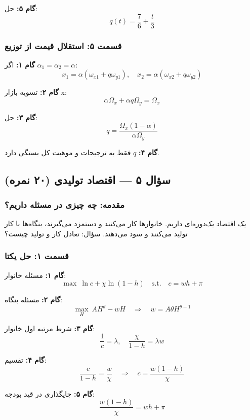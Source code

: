 \documentclass[12pt,a4paper]{article}
\begin{document}
\textbf{گام ۵:} حل:
\[
	\boxed{q(t) = \frac{7}{6} + \frac{t}{3}}
\]

\subsubsection{قسمت ۵: استقلال قیمت از توزیع}

\textbf{گام ۱:} اگر $\alpha_1 = \alpha_2 = \alpha$:
\[
	x_1 = \alpha(\omega_{x1} + q \omega_{y1}), \quad x_2 = \alpha(\omega_{x2} + q \omega_{y2})
\]

\textbf{گام ۲:} تسویه بازار x:
\[
	\alpha \Omega_x + \alpha q \Omega_y = \Omega_x
\]

\textbf{گام ۳:} حل:
\[
	\boxed{q = \frac{\Omega_x (1 - \alpha)}{\alpha \Omega_y}}
\]

\textbf{گام ۴:} $q$ فقط به ترجیحات و موهبت کل بستگی دارد.

\subsection{سؤال ۵ — اقتصاد تولیدی (۲۰ نمره)}

\subsubsection{مقدمه: چه چیزی در مسئله داریم؟}

یک اقتصاد یک‌دوره‌ای داریم. خانوارها کار می‌کنند و دستمزد می‌گیرند، بنگاه‌ها با کار تولید می‌کنند و سود می‌دهند. سؤال: تعادل کار و تولید چیست؟

\subsubsection{قسمت ۱: حل یکتا}

\textbf{گام ۱:} مسئله خانوار:
\[
	\max \ \ln c + \chi \ln(1-h) \quad \text{s.t.} \quad c = w h + \pi
\]

\textbf{گام ۲:} مسئله بنگاه:
\[
	\max_{H} \ A H^\theta - w H \quad \Rightarrow \quad w = A \theta H^{\theta - 1}
\]

\textbf{گام ۳:} شرط مرتبه اول خانوار:
\[
	\frac{1}{c} = \lambda, \quad \frac{\chi}{1 - h} = \lambda w
\]

\textbf{گام ۴:} تقسیم:
\[
	\frac{c}{1 - h} = \frac{w}{\chi} \quad \Rightarrow \quad c = \frac{w(1 - h)}{\chi}
\]

\textbf{گام ۵:} جایگذاری در قید بودجه:
\[
	\frac{w(1 - h)}{\chi} = w h + \pi
\]
\end{document}
